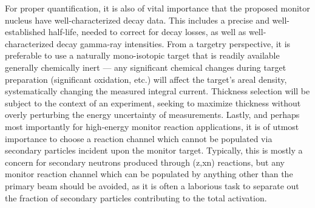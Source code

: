 \documentclass[%
 reprint,
superscriptaddress,
onecolumn,
linenumbers,
notitlepage,
 amsmath,amssymb,
 aps,
prc,
]{revtex4-1}
\newcommand{\comment}[1]{\todo[color=blue!20!white,inline]{ASV: #1}}
\begin{document}
For proper quantification, it is also of vital importance that the proposed monitor nucleus have well-characterized decay data.
This includes a precise and well-established half-life,  needed to  correct for decay losses, as well as well-characterized decay gamma-ray intensities.
From a targetry  perspective, it is preferable to use a naturally mono-isotopic target that is readily available
generally chemically inert --- any significant chemical changes during target preparation (significant oxidation, etc.) will affect the target's areal density, systematically changing the measured integral current. 
Thickness selection will be subject to the context of an experiment, seeking to maximize thickness without overly perturbing the energy uncertainty of  measurements.
Lastly, and perhaps most importantly for high-energy monitor reaction applications, it is  of utmost importance to choose a reaction channel which cannot be populated via secondary particles incident upon the monitor target.
Typically, this is  mostly a concern for secondary neutrons produced through (z,xn) reactions, 
but any monitor reaction channel which can be populated by anything other than the primary beam should be avoided, as it is often a laborious task to separate out the fraction of secondary particles contributing to the total activation.  
\end{document}
